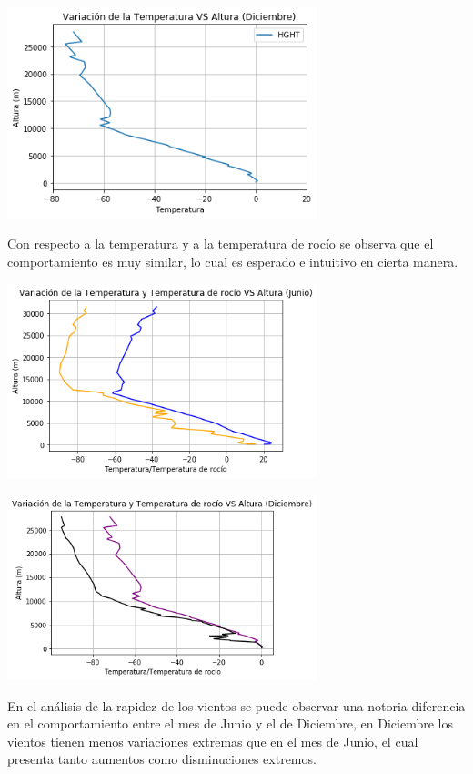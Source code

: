 \documentclass{article} %
\begin{document}
\begin{center}
 	\includegraphics[width=9cm]{4.png}
 \end{center}

Con respecto a la temperatura y a la temperatura de rocío se observa que el comportamiento es muy similar, lo cual es esperado e intuitivo en cierta manera. 

\begin{center}
 	\includegraphics[width=9cm]{5.png}
 \end{center}


\begin{center}
 	\includegraphics[width=9cm]{6.png}
 \end{center}

En el análisis de la rapidez de los vientos se puede observar una notoria diferencia en el comportamiento entre el mes de Junio y el de Diciembre, en Diciembre los vientos tienen menos variaciones extremas que en el mes de Junio, el cual presenta tanto aumentos como disminuciones extremos.
\end{document}
